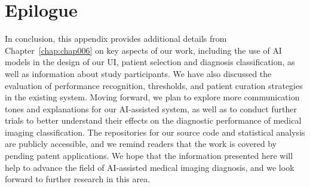 \section{Epilogue}
\label{sec:app001sec013}

In conclusion, this appendix provides additional details from Chapter~\ref{chap:chap006} on key aspects of our work, including the use of \ac{AI} models in the design of our \ac{UI}, patient selection and diagnosis classification, as well as information about study participants.
We have also discussed the evaluation of performance recognition, thresholds, and patient curation strategies in the existing system.
Moving forward, we plan to explore more communication tones and explanations for our \ac{AI}-assisted system, as well as to conduct further trials to better understand their effects on the diagnostic performance of medical imaging classification.
The repositories for our source code and statistical analysis are publicly accessible, and we remind readers that the work is covered by pending patent applications.
We hope that the information presented here will help to advance the field of \ac{AI}-assisted medical imaging diagnosis, and we look forward to further research in this area.